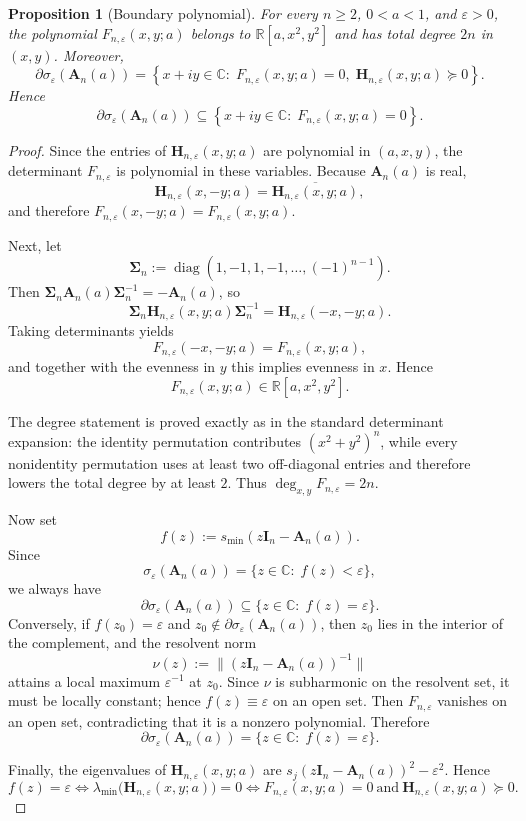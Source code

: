 \documentclass[11pt]{article}
\newtheorem{proposition}[theorem]{Proposition}
\DeclareMathOperator{\diag}{diag}
\newcommand{\R}{\mathbb{R}}
\newcommand{\C}{\mathbb{C}}
\begin{document}
\begin{proposition}[Boundary polynomial]\label{prop:boundary-polynomial}
For every \(n\ge 2\), \(0<a<1\), and \(\varepsilon>0\), the polynomial \(F_{n,\varepsilon}(x,y;a)\) belongs to \(\R[a,x^2,y^2]\) and has total degree \(2n\) in \((x,y)\). Moreover,
\[
\partial \sigma_\varepsilon(\mathbf A_n(a))
=
\left\{
x+iy\in\C:\;
F_{n,\varepsilon}(x,y;a)=0,\;
\mathbf H_{n,\varepsilon}(x,y;a)\succeq 0
\right\}.
\]
Hence
\[
\partial \sigma_\varepsilon(\mathbf A_n(a))
\subseteq
\left\{
x+iy\in\C:\;
F_{n,\varepsilon}(x,y;a)=0
\right\}.
\]
\end{proposition}

\begin{proof}
Since the entries of \(\mathbf H_{n,\varepsilon}(x,y;a)\) are polynomial in \((a,x,y)\), the determinant \(F_{n,\varepsilon}\) is polynomial in these variables. Because \(\mathbf A_n(a)\) is real,
\[
\mathbf H_{n,\varepsilon}(x,-y;a)
=
\overline{\mathbf H_{n,\varepsilon}(x,y;a)},
\]
and therefore \(F_{n,\varepsilon}(x,-y;a)=F_{n,\varepsilon}(x,y;a)\).

Next, let
\[
\mathbf\Sigma_n:=\diag(1,-1,1,-1,\dots,(-1)^{n-1}).
\]
Then \(\mathbf\Sigma_n\mathbf A_n(a)\mathbf\Sigma_n^{-1}=-\mathbf A_n(a)\), so
\[
\mathbf\Sigma_n\mathbf H_{n,\varepsilon}(x,y;a)\mathbf\Sigma_n^{-1}
=
\mathbf H_{n,\varepsilon}(-x,-y;a).
\]
Taking determinants yields
\[
F_{n,\varepsilon}(-x,-y;a)=F_{n,\varepsilon}(x,y;a),
\]
and together with the evenness in \(y\) this implies evenness in \(x\). Hence
\[
F_{n,\varepsilon}(x,y;a)\in \R[a,x^2,y^2].
\]

The degree statement is proved exactly as in the standard determinant expansion: the identity permutation contributes \((x^2+y^2)^n\), while every nonidentity permutation uses at least two off-diagonal entries and therefore lowers the total degree by at least \(2\). Thus \(\deg_{x,y}F_{n,\varepsilon}=2n\).

Now set
\[
f(z):=s_{\min}(z\mathbf I_n-\mathbf A_n(a)).
\]
Since
\[
\sigma_\varepsilon(\mathbf A_n(a))
=
\{z\in\C:\;f(z)<\varepsilon\},
\]
we always have
\[
\partial \sigma_\varepsilon(\mathbf A_n(a))
\subseteq
\{z\in\C:\;f(z)=\varepsilon\}.
\]
Conversely, if \(f(z_0)=\varepsilon\) and \(z_0\notin \partial \sigma_\varepsilon(\mathbf A_n(a))\), then \(z_0\) lies in the interior of the complement, and the resolvent norm
\[
\nu(z):=\|(z\mathbf I_n-\mathbf A_n(a))^{-1}\|
\]
attains a local maximum \(\varepsilon^{-1}\) at \(z_0\). Since \(\nu\) is subharmonic on the resolvent set, it must be locally constant; hence \(f(z)\equiv\varepsilon\) on an open set. Then \(F_{n,\varepsilon}\) vanishes on an open set, contradicting that it is a nonzero polynomial. Therefore
\[
\partial \sigma_\varepsilon(\mathbf A_n(a))
=
\{z\in\C:\;f(z)=\varepsilon\}.
\]

Finally, the eigenvalues of \(\mathbf H_{n,\varepsilon}(x,y;a)\) are \(s_j(z\mathbf I_n-\mathbf A_n(a))^2-\varepsilon^2\). Hence
\[
f(z)=\varepsilon
\iff
\lambda_{\min}\bigl(\mathbf H_{n,\varepsilon}(x,y;a)\bigr)=0
\iff
F_{n,\varepsilon}(x,y;a)=0
\ \text{and}\
\mathbf H_{n,\varepsilon}(x,y;a)\succeq 0.
\]
\end{proof}
\end{document}

